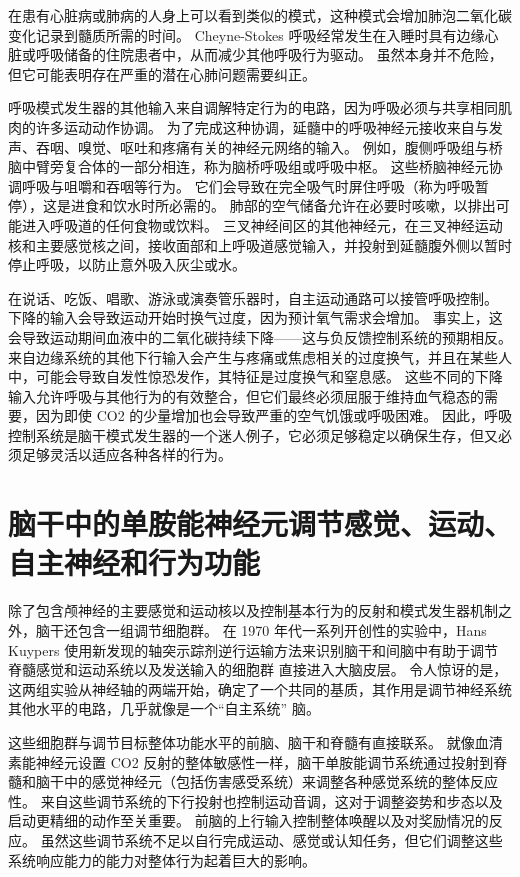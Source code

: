 在患有心脏病或肺病的人身上可以看到类似的模式，这种模式会增加肺泡二氧化碳变化记录到髓质所需的时间。 Cheyne-Stokes 呼吸经常发生在入睡时具有边缘心脏或呼吸储备的住院患者中，从而减少其他呼吸行为驱动。 虽然本身并不危险，但它可能表明存在严重的潜在心肺问题需要纠正。

呼吸模式发生器的其他输入来自调解特定行为的电路，因为呼吸必须与共享相同肌肉的许多运动动作协调。 为了完成这种协调，延髓中的呼吸神经元接收来自与发声、吞咽、嗅觉、呕吐和疼痛有关的神经元网络的输入。 例如，腹侧呼吸组与桥脑中臂旁复合体的一部分相连，称为脑桥呼吸组或呼吸中枢。 这些桥脑神经元协调呼吸与咀嚼和吞咽等行为。 它们会导致在完全吸气时屏住呼吸（称为呼吸暂停），这是进食和饮水时所必需的。 肺部的空气储备允许在必要时咳嗽，以排出可能进入呼吸道的任何食物或饮料。 三叉神经间区的其他神经元，在三叉神经运动核和主要感觉核之间，接收面部和上呼吸道感觉输入，并投射到延髓腹外侧以暂时停止呼吸，以防止意外吸入灰尘或水。

在说话、吃饭、唱歌、游泳或演奏管乐器时，自主运动通路可以接管呼吸控制。 下降的输入会导致运动开始时换气过度，因为预计氧气需求会增加。 事实上，这会导致运动期间血液中的二氧化碳持续下降——这与负反馈控制系统的预期相反。 来自边缘系统的其他下行输入会产生与疼痛或焦虑相关的过度换气，并且在某些人中，可能会导致自发性惊恐发作，其特征是过度换气和窒息感。 这些不同的下降输入允许呼吸与其他行为的有效整合，但它们最终必须屈服于维持血气稳态的需要，因为即使 CO2 的少量增加也会导致严重的空气饥饿或呼吸困难。 因此，呼吸控制系统是脑干模式发生器的一个迷人例子，它必须足够稳定以确保生存，但又必须足够灵活以适应各种各样的行为。


\section{脑干中的单胺能神经元调节感觉、运动、自主神经和行为功能}
除了包含颅神经的主要感觉和运动核以及控制基本行为的反射和模式发生器机制之外，脑干还包含一组调节细胞群。 在 1970 年代一系列开创性的实验中，Hans Kuypers 使用新发现的轴突示踪剂逆行运输方法来识别脑干和间脑中有助于调节脊髓感觉和运动系统以及发送输入的细胞群 直接进入大脑皮层。 令人惊讶的是，这两组实验从神经轴的两端开始，确定了一个共同的基质，其作用是调节神经系统其他水平的电路，几乎就像是一个“自主系统” 脑。

这些细胞群与调节目标整体功能水平的前脑、脑干和脊髓有直接联系。 就像血清素能神经元设置 CO2 反射的整体敏感性一样，脑干单胺能调节系统通过投射到脊髓和脑干中的感觉神经元（包括伤害感受系统）来调整各种感觉系统的整体反应性。 来自这些调节系统的下行投射也控制运动音调，这对于调整姿势和步态以及启动更精细的动作至关重要。 前脑的上行输入控制整体唤醒以及对奖励情况的反应。 虽然这些调节系统不足以自行完成运动、感觉或认知任务，但它们调整这些系统响应能力的能力对整体行为起着巨大的影响。

